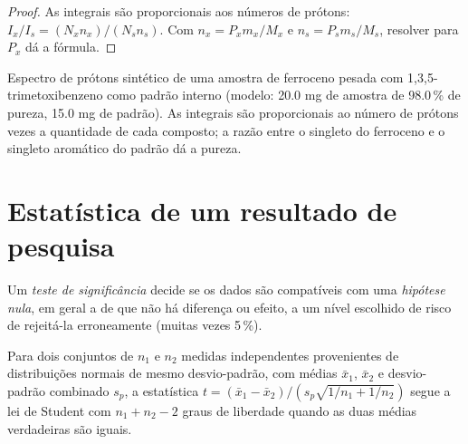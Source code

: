 \begin{proof}
As integrais são proporcionais aos números de prótons: $I_x/I_s = (N_xn_x)/(N_sn_s)$. Com
$n_x = P_xm_x/M_x$ e $n_s = P_sm_s/M_s$, resolver para $P_x$ dá a fórmula.
\end{proof}

\begin{omfigure}

{\small Espectro de prótons sintético de uma amostra de ferroceno pesada com
1,3,5-trimetoxibenzeno como padrão interno (modelo: 20.0 mg de amostra de 98.0\,\% de
pureza, 15.0 mg de padrão). As integrais são proporcionais ao número de
prótons vezes a quantidade de cada composto; a razão entre o singleto do ferroceno e
o singleto aromático do padrão dá a pureza.}
\end{omfigure}

\section{Estatística de um resultado de pesquisa}

\begin{definition}\label{def:b3:lab-techniques-3:tests}
Um \emph{teste de significância} decide se os dados são
compatíveis com uma \emph{hipótese nula}, em geral a de que
não há diferença ou efeito, a um nível escolhido de risco de rejeitá-la
erroneamente (muitas vezes 5\,\%).
\end{definition}

\begin{theorem}\label{thm:b3:lab-techniques-3:t-test}
Para dois conjuntos de $n_1$ e $n_2$ medidas independentes provenientes de distribuições
normais de mesmo desvio-padrão, com médias $\bar x_1$, $\bar x_2$ e desvio-padrão combinado
$s_p$, a estatística $t = (\bar x_1 - \bar x_2)/(s_p\sqrt{1/n_1 + 1/n_2})$ segue a lei de Student com
$n_1 + n_2 - 2$ graus de liberdade quando as duas médias verdadeiras são iguais. \admitted
\end{theorem}

